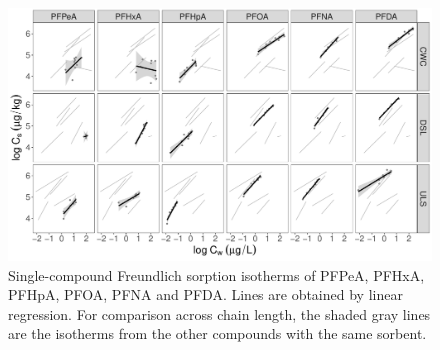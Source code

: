 \begin{figure}[tb]
    \centering
    \includegraphics[width=\textwidth]{R/figs/BC_facet_isotherm.pdf}
    \caption{Single-compound Freundlich sorption isotherms of PFPeA, PFHxA, PFHpA, PFOA, PFNA and PFDA. Lines are obtained by linear regression. For comparison across chain length, the shaded gray lines are the isotherms from the other compounds with the same sorbent.}
    \label{fig:sorption_isotherms_all}
\end{figure}

